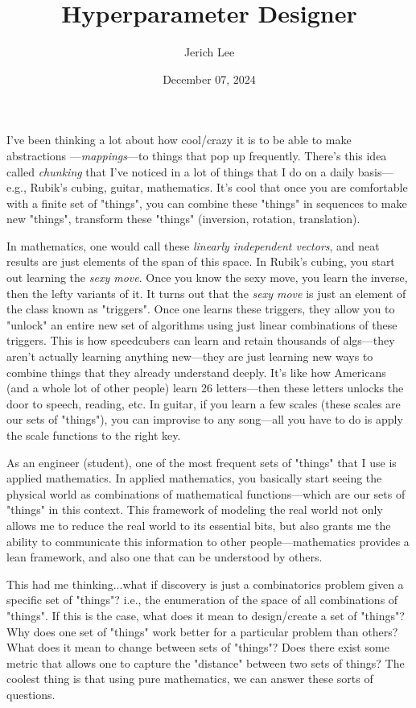 \documentclass[12pt]{article}
\title{Hyperparameter Designer}
\author{Jerich Lee}
\date{December 07, 2024}
\theoremstyle{definition} %
\theoremstyle{plain} %
\begin{document}
\maketitle

I've been thinking a lot about how cool/crazy it is to be able to make abstractions
—\emph{mappings}—to things that pop up frequently. There's this idea
called \emph{chunking} that I've noticed in a lot of things that I do on a daily basis—e.g., Rubik's cubing, guitar, mathematics. It's cool that once you 
are comfortable with a finite set of "things", you can combine these "things" in sequences to make new "things", transform these "things" (inversion, rotation, translation). 

In mathematics, one would call these \emph{linearly independent vectors}, and neat results are just elements of the span of this space.
In Rubik's cubing, you start out learning the \emph{sexy move}. Once you know the sexy move, you learn the inverse, then the lefty variants of it. It turns out that the \emph{sexy move} is just an element of the class known as "triggers". Once one learns these triggers, they 
allow you to "unlock" an entire new set of algorithms using just linear combinations of these triggers. This is how speedcubers can learn and retain thousands of algs—they aren't actually learning anything new—they are just learning new ways to combine things that they already understand deeply. It's like how Americans (and a whole lot of other people) learn 26 letters—then these letters unlocks the 
door to speech, reading, etc. In guitar, if you learn a few scales (these scales are our sets of "things"), you can improvise to any song—all you have to do is apply the scale functions to the right key.
    

As an engineer (student), one of the most frequent sets of "things" that I use is applied mathematics. In applied mathematics, you basically start seeing the physical world as combinations of mathematical functions—which are our sets of "things" in this context. This framework of modeling the real world not only allows me to reduce the real world to its essential bits, but also grants me the ability to communicate this information to other people—mathematics provides a lean framework, and also one that can be understood by others.

This had me thinking...what if discovery is just a combinatorics problem given a specific set of "things"? i.e., the enumeration of the space of all combinations of "things". If this is the case, what does it mean to design/create a set of "things"? Why does one set of "things" work better for a particular problem than others? What does it mean to change between sets of "things"? Does there exist some metric that allows one to capture the "distance" between two sets of things? The coolest thing is that using pure mathematics, we can answer these sorts of questions.
\end{document}
